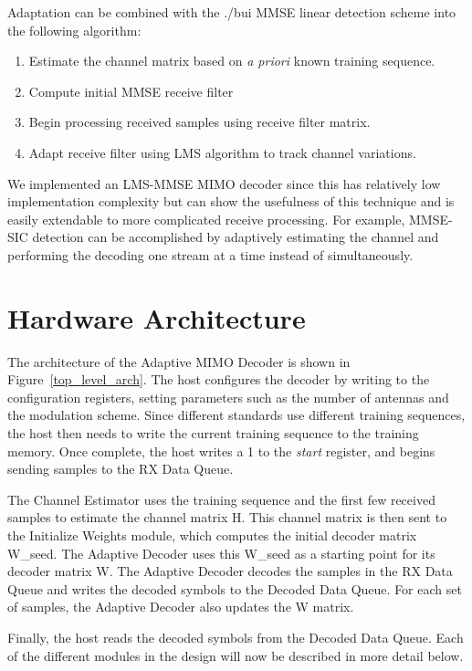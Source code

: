 \documentclass[journal]{IEEEtran}
\begin{document}
Adaptation can be combined with the ./bui   MMSE linear detection scheme into the following algorithm:
\begin{enumerate}
\item Estimate the channel matrix based on {\em a priori} known training sequence.
\item Compute initial MMSE receive filter
\item Begin processing received samples using receive filter matrix.
\item Adapt receive filter using LMS algorithm to track channel variations.
\end{enumerate}

We implemented an LMS-MMSE MIMO decoder since this has relatively low implementation complexity but can show the usefulness of this technique and is easily extendable to more complicated receive processing. For example, MMSE-SIC detection can be accomplished by adaptively estimating the channel and performing the decoding one stream at a time instead of simultaneously. 

\section{Hardware Architecture}

The architecture of the Adaptive MIMO Decoder is shown in Figure~\ref{top_level_arch}. The host configures the decoder by writing to the configuration registers, setting parameters such as the number of antennas and the modulation scheme. Since different standards use different training sequences, the host then needs to write the current training sequence to the training memory. Once complete, the host writes a 1 to the {\em start} register, and begins sending samples to the RX Data Queue.

The Channel Estimator uses the training sequence and the first few received samples to estimate the channel matrix H. This channel matrix is then sent to the Initialize Weights module, which computes the initial decoder matrix W\_seed. The Adaptive Decoder uses this W\_seed as a starting point for its decoder matrix W. The Adaptive Decoder decodes the samples in the RX Data Queue and writes the decoded symbols to the Decoded Data Queue. For each set of samples, the Adaptive Decoder also updates the W matrix.

Finally, the host reads the decoded symbols from the Decoded Data Queue. Each of the different modules in the design will now be described in more detail below.
\end{document}
